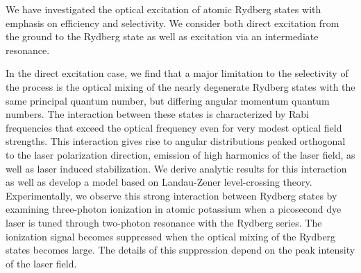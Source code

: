 



%






We have investigated the optical excitation of atomic Rydberg states with
emphasis on efficiency and selectivity.   We consider both direct excitation
from the ground to the Rydberg state as well as excitation via an
intermediate resonance.

In the direct excitation case, we find that a major limitation to the
selectivity of the process is the optical mixing of the nearly degenerate
Rydberg states with the same principal quantum number, but differing angular
momentum quantum numbers.  The interaction between these states is
characterized by Rabi frequencies that exceed the optical frequency even for
very modest optical field strengths.  This interaction gives rise to angular
distributions peaked orthogonal to the laser polarization direction,
emission of high harmonics of the laser field, as well as laser induced
stabilization.  We derive analytic results for this interaction as well as
develop a model based on Landau-Zener level-crossing theory.  Experimentally,
we observe this strong interaction between Rydberg states by examining
three-photon ionization in atomic potassium when a picosecond dye laser is tuned
through two-photon resonance with the Rydberg series.  The ionization signal
becomes suppressed when the optical mixing of the Rydberg states becomes large. 
The details of this suppression depend on the peak intensity of the laser field.

